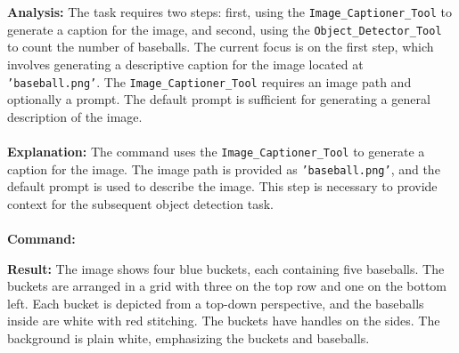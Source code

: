 \begin{executorbox}

\textbf{Analysis:}
The task requires two steps: first, using the \texttt{Image\_Captioner\_Tool} to generate a caption for the image, and second, using the \texttt{Object\_Detector\_Tool} to count the number of baseballs. The current focus is on the first step, which involves generating a descriptive caption for the image located at \texttt{'baseball.png'}. The \texttt{Image\_Captioner\_Tool} requires an image path and optionally a prompt. The default prompt is sufficient for generating a general description of the image.
\\\\
\textbf{Explanation:}
The command uses the \texttt{Image\_Captioner\_Tool} to generate a caption for the image. The image path is provided as \texttt{'baseball.png'}, and the default prompt is used to describe the image. This step is necessary to provide context for the subsequent object detection task.
\\\\
\textbf{Command:}
\end{executorbox}


\begin{executorbox}
\textbf{Result:}
The image shows four blue buckets, each containing five baseballs. The buckets are arranged in a grid with three on the top row and one on the bottom left. Each bucket is depicted from a top-down perspective, and the baseballs inside are white with red stitching. The buckets have handles on the sides. The background is plain white, emphasizing the buckets and baseballs.
\end{executorbox}


